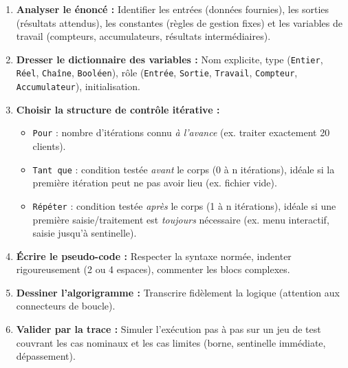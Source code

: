 \documentclass[11pt]{article}
\begin{document}
\begin{methode}
\begin{enumerate}
    \item \textbf{Analyser le énoncé :} Identifier les entrées (données fournies), les sorties (résultats attendus), les constantes (règles de gestion fixes) et les variables de travail (compteurs, accumulateurs, résultats intermédiaires).
    \item \textbf{Dresser le dictionnaire des variables :} Nom explicite, type (\texttt{Entier}, \texttt{Réel}, \texttt{Chaîne}, \texttt{Booléen}), rôle (\texttt{Entrée}, \texttt{Sortie}, \texttt{Travail}, \texttt{Compteur}, \texttt{Accumulateur}), initialisation.
    \item \textbf{Choisir la structure de contrôle itérative :}
    \begin{itemize}
        \item \texttt{Pour} : nombre d'itérations connu \emph{à l'avance} (ex. traiter exactement 20 clients).
        \item \texttt{Tant que} : condition testée \emph{avant} le corps (0 à n itérations), idéale si la première itération peut ne pas avoir lieu (ex. fichier vide).
        \item \texttt{Répéter} : condition testée \emph{après} le corps (1 à n itérations), idéale si une première saisie/traitement est \emph{toujours} nécessaire (ex. menu interactif, saisie jusqu'à sentinelle).
    \end{itemize}
    \item \textbf{Écrire le pseudo-code :} Respecter la syntaxe normée, indenter rigoureusement (2 ou 4 espaces), commenter les blocs complexes.
    \item \textbf{Dessiner l'algorigramme :} Transcrire fidèlement la logique (attention aux connecteurs de boucle).
    \item \textbf{Valider par la trace :} Simuler l'exécution pas à pas sur un jeu de test couvrant les cas nominaux et les cas limites (borne, sentinelle immédiate, dépassement).
\end{enumerate}
\end{methode}
\end{document}
